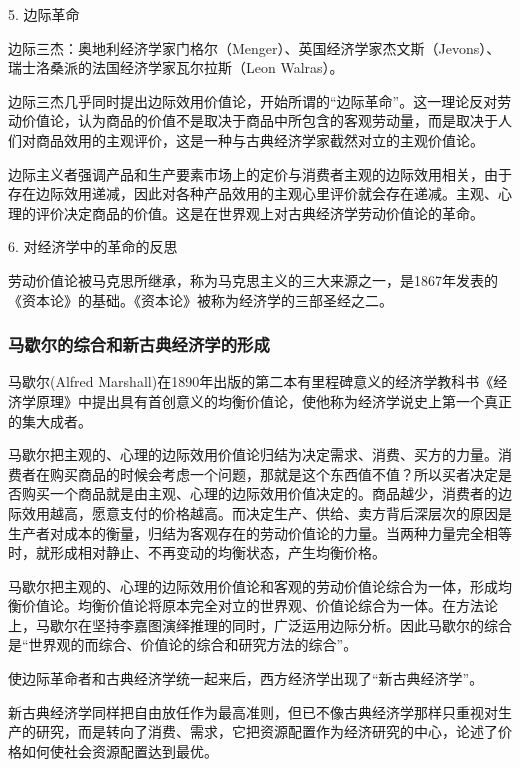 \documentclass{article}
\begin{document}
\hspace*{\fill}

5. 边际革命

边际三杰：奥地利经济学家门格尔（Menger）、英国经济学家杰文斯（Jevons）、瑞士洛桑派的法国经济学家瓦尔拉斯（Leon  Walras）。

边际三杰几乎同时提出边际效用价值论，开始所谓的“边际革命”。这一理论反对劳动价值论，认为商品的价值不是取决于商品中所包含的客观劳动量，而是取决于人们对商品效用的主观评价，这是一种与古典经济学家截然对立的主观价值论。

边际主义者强调产品和生产要素市场上的定价与消费者主观的边际效用相关，由于存在边际效用递减，因此对各种产品效用的主观心里评价就会存在递减。主观、心理的评价决定商品的价值。这是在世界观上对古典经济学劳动价值论的革命。

\hspace*{\fill}

6. 对经济学中的革命的反思

劳动价值论被马克思所继承，称为马克思主义的三大来源之一，是1867年发表的《资本论》的基础。《资本论》被称为经济学的三部圣经之二。

\subsubsection{马歇尔的综合和新古典经济学的形成}

马歇尔(Alfred Marshall)在1890年出版的第二本有里程碑意义的经济学教科书《经济学原理》中提出具有首创意义的均衡价值论，使他称为经济学说史上第一个真正的集大成者。

马歇尔把主观的、心理的边际效用价值论归结为决定需求、消费、买方的力量。消费者在购买商品的时候会考虑一个问题，那就是这个东西值不值？所以买者决定是否购买一个商品就是由主观、心理的边际效用价值决定的。商品越少，消费者的边际效用越高，愿意支付的价格越高。而决定生产、供给、卖方背后深层次的原因是生产者对成本的衡量，归结为客观存在的劳动价值论的力量。当两种力量完全相等时，就形成相对静止、不再变动的均衡状态，产生均衡价格。

马歇尔把主观的、心理的边际效用价值论和客观的劳动价值论综合为一体，形成均衡价值论。均衡价值论将原本完全对立的世界观、价值论综合为一体。在方法论上，马歇尔在坚持李嘉图演绎推理的同时，广泛运用边际分析。因此马歇尔的综合是“世界观的而综合、价值论的综合和研究方法的综合”。

使边际革命者和古典经济学统一起来后，西方经济学出现了“新古典经济学”。

新古典经济学同样把自由放任作为最高准则，但已不像古典经济学那样只重视对生产的研究，而是转向了消费、需求，它把资源配置作为经济研究的中心，论述了价格如何使社会资源配置达到最优。
\end{document}
